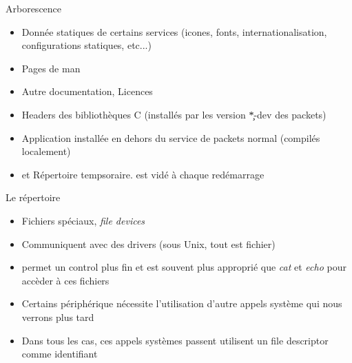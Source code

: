 \begin{frame}[fragile=singleslide]{Arborescence}
  \begin{itemize}
  \item {} Donnée  statiques de certains services (icones,
    fonts, internationalisation, configurations statiques, etc...)
  \item {} Pages de man
  \item {} Autre documentation, Licences
  \item  {} Headers des  bibliothèques C  (installés par
    les version \c{*-dev} des packets)
  \item  {}   Application installée  en  dehors du
    service de packets normal (compilés localement)
  \item {} et   Répertoire tempsoraire.  est
    vidé à chaque redémarrage
  \end{itemize}
\end{frame}

\begin{frame}[fragile=singleslide]{Le répertoire }
  \begin{itemize}
  \item Fichiers spéciaux, \emph{file devices}
  \item Communiquent avec des drivers (sous Unix, tout est fichier)
  \item {}  permet un control  plus fin et est  souvent plus
    approprié  que  \emph{cat}  et  \emph{echo}  pour  accèder  à  ces
    fichiers
  \item Certains  périphérique nécessite l'utilisation  d'autre appels
    système qui nous verrons plus tard
  \item Dans  tous les cas,  ces appels systèmes passent  utilisent un
    file descriptor comme identifiant
  \end{itemize}
\end{frame}

